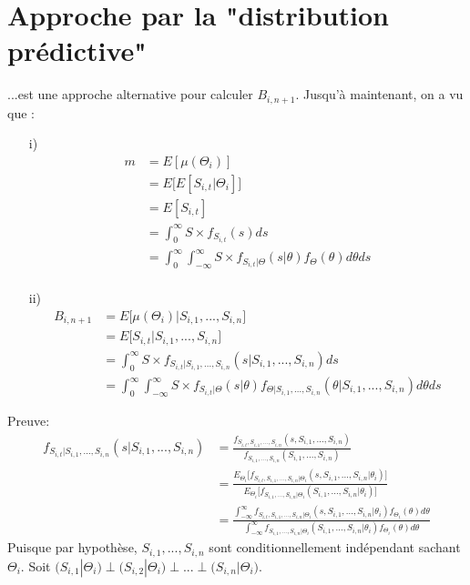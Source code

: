 \documentclass[11pt,french]{report}
\begin{document}
\section{Approche par la "distribution prédictive"}
...est une approche alternative pour calculer $B_{i,n+1}$. Jusqu'à maintenant, on a vu que :
\begin{itemize}
\item[i)] \begin{align*}
m &=  E[\mu(\Theta_i)] \\
&= E\Big[E[S_{i,t}|\Theta_i] \Big] \\
&= E[S_{i,t}] \\
&= \int_{0}^{\infty} S \times f_{S_{i,t}}(s)ds \\
&= \int_{0}^{\infty} \int_{-\infty}^{\infty} S \times f_{S_{i,t}|\Theta}(s|\theta)f_{\Theta}(\theta) d\theta ds \\
\end{align*}

\item[ii)] \begin{align*}
B_{i,n+1} &= E \Big[ \mu(\Theta_i) | S_{i,1}, ..., S_{i,n}\Big] \\
&=  E \Big[S_{i,t} | S_{i,1}, ..., S_{i,n}\Big] \\
&= \int_{0}^{\infty} S \times f_{S_{i,t}|S_{i,1}, ..., S_{i,n}}(s|S_{i,1}, ..., S_{i,n})ds \\
&= \int_{0}^{\infty} \int_{-\infty}^{\infty}  S \times  f_{S_{i,t}|\Theta}(s|\theta) f_{\Theta|S_{i,1}, ..., S_{i,n}}(\theta|S_{i,1}, ..., S_{i,n})d\theta ds
\end{align*}
\end{itemize}
Preuve:
\begin{align*}
f_{S_{i,t}|S_{i,1}, ..., S_{i,n}}(s|S_{i,1}, ..., S_{i,n}) &= \frac{f_{S_{i,t},S_{i,1}, ..., S_{i,n}}(s,S_{i,1}, ..., S_{i,n})}{f_{S_{i,1}, ..., S_{i,n}}(S_{i,1}, ..., S_{i,n})} \\
&= \frac{E_{\Theta_i}\Big[f_{S_{i,t},S_{i,1}, ..., S_{i,n}|\Theta_i}(s,S_{i,1}, ..., S_{i,n}|\theta_i) \Big]}{E_{\Theta_i}\Big[f_{S_{i,1}, ..., S_{i,n}|\Theta_i}(S_{i,1}, ..., S_{i,n}|\theta_i)\Big]} \\
&= \frac{\int_{-\infty}^{\infty} f_{S_{i,t},S_{i,1}, ..., S_{i,n}|\Theta_i}(s,S_{i,1}, ..., S_{i,n}|\theta_i) f_{\Theta_i}(\theta)d\theta}{\int_{-\infty}^{\infty} f_{S_{i,1}, ..., S_{i,n}|\Theta_i}(S_{i,1}, ..., S_{i,n}|\theta_i) f_{\Theta_i}(\theta)d\theta} 
\end{align*}
Puisque par hypothèse, $S_{i,1}, ..., S_{i,n}$ sont conditionnellement indépendant sachant $\Theta_i$. Soit $\Big(S_{i,1}|\Theta_i \Big) \perp \Big(S_{i,2}|\Theta_i \Big) \perp ... \perp \Big(S_{i,n}|\Theta_i  \Big)$.
\end{document}
